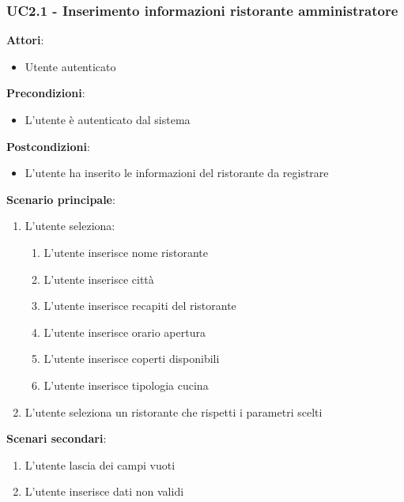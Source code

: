 \subsubsection{UC2.1 - Inserimento informazioni ristorante amministratore}\label{usecase:2_1}
\textbf{Attori}:
\begin{itemize}
    \item Utente autenticato
\end{itemize}
\textbf{Precondizioni}:
\begin{itemize}
    \item L'utente è autenticato dal sistema
\end{itemize}
\textbf{Postcondizioni}:
\begin{itemize}
    \item L'utente ha inserito le informazioni del ristorante da registrare
\end{itemize}
\textbf{Scenario principale}:
\begin{enumerate}
    \item L'utente seleziona:
    \begin{enumerate}
        \item L'utente inserisce nome ristorante
        \item L'utente inserisce città
        \item L'utente inserisce recapiti del ristorante
        \item L'utente inserisce orario apertura
        \item L'utente inserisce coperti disponibili
        \item L'utente inserisce tipologia cucina
    \end{enumerate}
    \item L'utente seleziona un ristorante che rispetti i parametri scelti
\end{enumerate}
\textbf{Scenari secondari}:
    \begin{enumerate}
        \item L'utente lascia dei campi vuoti
        \item L'utente inserisce dati non validi
    \end{enumerate}
\newpage